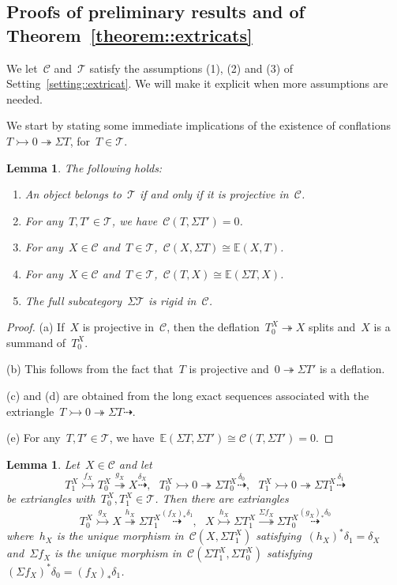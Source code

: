 \documentclass{amsart}
\newtheorem{lemma}[theorem]{Lemma}
\theoremstyle{definition}
\newcommand{\cat}{\mathcal{C}}
\newcommand{\susp}{\Sigma}
\newcommand{\tc}{\mathcal{T}}
\newcommand{\infl}{\rightarrowtail}
\newcommand{\defl}{\twoheadrightarrow}
\begin{document}
\subsection{Proofs of preliminary results and of Theorem~\ref{theorem::extricats}}
\label{sect::proofs extricats}

We let~$\cat$ and~$\tc$ satisfy the assumptions (1), (2) and (3) of Setting~\ref{setting::extricat}.
We will make it explicit when more assumptions are needed.

We start by stating some immediate implications of the existence of conflations~$T\infl 0 \defl \susp T$, for~$T\in\tc$.

\begin{lemma}
\label{lemma::first consequences}
The following holds:
\begin{enumerate}[{\rm (a)}]
 \item An object belongs to~$\tc$ if and only if it is projective in~$\cat$.
 \item For any~$T,T'\in\tc$, we have~$\cat(T,\susp T')=0$.
 \item For any~$X\in\cat$ and~$T\in\tc$,~$\cat(X,\susp T)\cong\mathbb{E}(X,T)$.
 \item For any~$X\in\cat$ and~$T\in\tc$,~$\cat(T,X)\cong\mathbb{E}(\susp T,X)$.
 \item The full subcategory~$\susp\tc$ is rigid in~$\cat$.
\end{enumerate}
\end{lemma}

\begin{proof}
(a) If~$X$ is projective in~$\cat$, then the deflation~$T_0^X\defl X$ splits and~$X$ is a summand of~$T_0^X$.

(b) This follows from the fact that~$T$ is projective and~$0\defl\susp T'$ is a deflation.

(c) and (d) are obtained from the long exact sequences associated with the extriangle~$T\infl 0\defl \susp T\dashrightarrow$.

(e) For any~$T,T'\in\tc$, we have~$\mathbb{E}(\susp T,\susp T') \cong \cat(T,\susp T')=0$.
\end{proof}

\begin{lemma}
\label{lemma::shifts of extriangles}
Let~$X\in\cat$ and let
\[
T_1^X\overset{f_X}{\infl} T_0^X\overset{g_X}{\defl} X \overset{\delta_X}{\dashrightarrow}, \ \ \ T_0^X\infl 0\defl \susp T_0^X\overset{\delta_0}{\dashrightarrow}, \ \ \ T_1^X\infl 0\defl \susp T_1^X\overset{\delta_1}{\dashrightarrow}
\]
be extriangles with~$T_0^X,T_1^X\in\tc$.
Then there are extriangles
\[
T_0^X\overset{g_X}{\infl} X \overset{h_X}{\defl} \susp T_1^X \overset{(f_X)_\ast\delta_1}{\dashrightarrow}, \ \ \ X \overset{h_X}{\infl} \susp T_1^X \overset{\susp f_X}{\defl} \susp T_0^X \overset{(g_X)_\ast\delta_0}{\dashrightarrow}
\]
where~$h_X$ is the unique morphism in~$\cat(X,\susp T_1^X)$ satisfying~$(h_X)^\ast\delta_1=\delta_X$ and~$\susp f_X$ is the unique morphism in~$\cat(\susp T_1^X,\susp T_0^X)$ satisfying~$(\susp f_X)^\ast\delta_0 = (f_X)_\ast\delta_1$.
\end{lemma}
\end{document}
